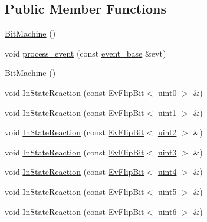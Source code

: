 \subsection*{Public Member Functions}
\begin{DoxyCompactItemize}
\item 
\mbox{\hyperlink{struct_bit_machine_a58f14b49b03c4763e3c4b8737ba285fe}{Bit\+Machine}} ()
\item 
void \mbox{\hyperlink{struct_bit_machine_ae77e5375e470002e98bde6307793b102}{process\+\_\+event}} (const \mbox{\hyperlink{classevent__base}{event\+\_\+base}} \&evt)
\item 
\mbox{\hyperlink{struct_bit_machine_a58f14b49b03c4763e3c4b8737ba285fe}{Bit\+Machine}} ()
\item 
void \mbox{\hyperlink{struct_bit_machine_afca2097dd81c0e01f7a7bafc0cb7f97b}{In\+State\+Reaction}} (const \mbox{\hyperlink{struct_ev_flip_bit}{Ev\+Flip\+Bit}}$<$ \mbox{\hyperlink{_performance_8cpp_ac4323a4a68daf3126a7be25628f1d622}{uint0}} $>$ \&)
\item 
void \mbox{\hyperlink{struct_bit_machine_a3e3d1636ee5cdee7fbf9bc4311dad61d}{In\+State\+Reaction}} (const \mbox{\hyperlink{struct_ev_flip_bit}{Ev\+Flip\+Bit}}$<$ \mbox{\hyperlink{_performance_8cpp_afada4030cdd8c9628ca412e4409d07d1}{uint1}} $>$ \&)
\item 
void \mbox{\hyperlink{struct_bit_machine_a0070c2dc29514f2904c388f531e0a568}{In\+State\+Reaction}} (const \mbox{\hyperlink{struct_ev_flip_bit}{Ev\+Flip\+Bit}}$<$ \mbox{\hyperlink{_performance_8cpp_ad7cf25dde7cbe398d57ed74b7109aaaa}{uint2}} $>$ \&)
\item 
void \mbox{\hyperlink{struct_bit_machine_a91742d27fd72fa6c301116f5618a6489}{In\+State\+Reaction}} (const \mbox{\hyperlink{struct_ev_flip_bit}{Ev\+Flip\+Bit}}$<$ \mbox{\hyperlink{_performance_8cpp_a487e33775f12c3ab023e66546a69810f}{uint3}} $>$ \&)
\item 
void \mbox{\hyperlink{struct_bit_machine_abf277c6f89800d794ca2bbaba62de89b}{In\+State\+Reaction}} (const \mbox{\hyperlink{struct_ev_flip_bit}{Ev\+Flip\+Bit}}$<$ \mbox{\hyperlink{_performance_8cpp_aa143aaac7fcfe524f6f4f33cc878ae95}{uint4}} $>$ \&)
\item 
void \mbox{\hyperlink{struct_bit_machine_a9b51c97e12366b4895b1b161e06c826f}{In\+State\+Reaction}} (const \mbox{\hyperlink{struct_ev_flip_bit}{Ev\+Flip\+Bit}}$<$ \mbox{\hyperlink{_performance_8cpp_a34732dbaa46d46251e4ac1faef9fcecd}{uint5}} $>$ \&)
\item 
void \mbox{\hyperlink{struct_bit_machine_aa3060810568983a875d87205613e2b68}{In\+State\+Reaction}} (const \mbox{\hyperlink{struct_ev_flip_bit}{Ev\+Flip\+Bit}}$<$ \mbox{\hyperlink{_performance_8cpp_a76e4a9cf398589b4ad27852c9f4389f9}{uint6}} $>$ \&)

\end{DoxyCompactItemize}
